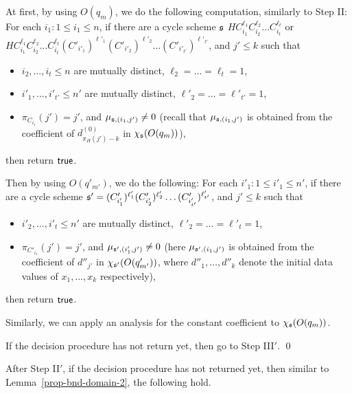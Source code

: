 \hide
{
At first, by using $O(q_m)$, we do the following computation, similarly to Step II: For each $i_1: 1 \le i_1 \le n$, if there are a cycle scheme ${\mathfrak{s} }$  
$HC_{i_1}^{\ell_1} C_{i_2}^{\ell_2} \dots C_{i_t}^{\ell_t}
$
or 
$HC_{i_1}^{\ell_1} C_{i_2}^{\ell_2} \dots C_{i_t}^{\ell_t} (C'_{i'_1})^{\ell'_1} (C'_{i'_2})^{\ell'_2} \dots (C'_{i'_{t'}})^{\ell'_{t'}}$,
and $j' \le k$ such that 
\begin{itemize}
\item $i_2,\dots,i_t \le n$ are mutually distinct, $\ell_2 = \dots = \ell_t = 1$, 
%
\item $i'_1,\dots,i'_{t'} \le n'$ are mutually distinct, $\ell'_2 = \dots = \ell'_{t'} = 1$, 
%
\item $\pi_{C_{i_1}}(j')=j'$, and $\mu_{{\mathfrak{s} },(i_1,j')} \neq 0$ (recall that $\mu_{{\mathfrak{s} },(i_1,j')}$ is obtained from the coefficient of $d^{(0)}_{\pi_H(j')-k}$ in  $\chi_{\mathfrak{s} }(O(q_m))$), 
\end{itemize}
then return $\mathsf{true}$. 

Then by using $O(q'_{m'})$, we do the following: For each $i'_1: 1 \le i'_1 \le n'$, if there are a cycle scheme ${\mathfrak{s} }' =(C'_{i'_1})^{\ell'_1} (C'_{i'_2})^{\ell'_2} \dots (C'_{i'_{t'}})^{\ell'_{t'}}$, and $j' \le k$ such that
\begin{itemize}
\item $i'_2,\dots,i'_t \le n'$ are mutually distinct, $\ell'_2 = \dots = \ell'_t = 1$, 
%
\item $\pi_{C'_{i_1}}(j')=j'$, and $\mu_{{\mathfrak{s} }',(i'_1,j')} \neq 0$ (here $\mu_{{\mathfrak{s} }',(i_1,j')}$ is obtained from the coefficient of $d''_{j'}$ in  $\chi_{{\mathfrak{s} }'}(O(q'_{m'}))$, where $d''_1,\dots,d''_k$ denote the initial data values of $x_1,\dots,x_k$ respectively),
\end{itemize}
then return $\mathsf{true}$. 

Similarly, we can apply an analysis for the constant coefficient to $\chi_{\mathfrak{s} }(O(q_m))$. 


If the decision procedure has not return yet, then go to Step III$'$. \qed
}
After Step II$'$, if the decision procedure has not returned yet, then similar to Lemma~\ref{prop-bnd-domain-2}, the following hold.

